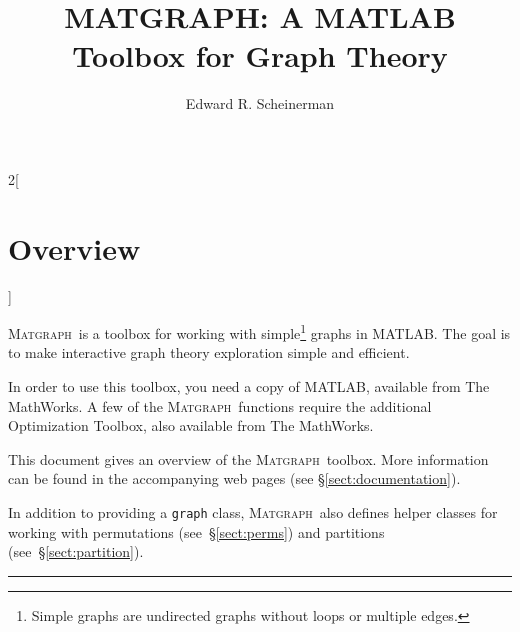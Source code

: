 \documentclass{amsart}
\title[Matgraph]{MATGRAPH: A MATLAB Toolbox for Graph Theory}
\author[Ed Scheinerman]{Edward R. Scheinerman}
\date{\superdate}
\newcommand\matlab{MATLAB}
\newcommand\matgraph{\textsc{Matgraph}}
\begin{document}
\maketitle

\begin{multicols}{2}[\section*{Overview}]

\matgraph\ is a toolbox for working with simple\footnote{Simple graphs
  are undirected graphs without loops or multiple edges.} graphs in
\matlab. The goal is to make interactive graph theory exploration
simple and efficient. 

In order to use this toolbox, you need a copy of \matlab, available
from The MathWorks. A few of the \matgraph\ functions require the
additional Optimization Toolbox, also available from The MathWorks.

This document gives an overview of the \matgraph\ toolbox. More
information can be found in the accompanying web pages (see
\S\ref{sect:documentation}). 


In addition to providing a \verb|graph| class, \matgraph\ also
defines helper classes for working with permutations
(see~\S\ref{sect:perms}) and partitions
(see~\S\ref{sect:partition}).

\end{multicols}
\hrule
\end{document}
